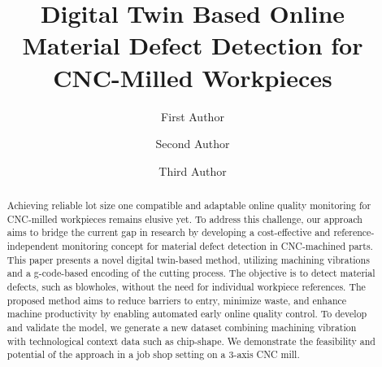 \documentclass[5p,times,procedia]{elsarticle}
\begin{document}
\begin{frontmatter}






\title{Digital Twin Based Online Material Defect Detection for CNC-Milled Workpieces}




\author[a,b]{First Author} 
\author[a,c]{Second Author}%
\author[b]{Third Author}

\address[a]{ESB Business School, Reutlingen University, Alteburgstra\ss e 150, 72762 Reutlingen, Germany}
\address[b]{Department of Industrial Engineering, Stellenbosch University, Joubert Street, Stellenbosch, 7600, South Africa}
\address[c]{Fraunhofer Institute for Manufacturing Engineering and Automation IPA, Nobelstra\ss e 12, 70569 Stuttgart, Germany}


\begin{abstract}
Achieving reliable lot size one compatible and adaptable online quality monitoring for CNC-milled workpieces remains elusive yet.
To address this challenge, our approach aims to bridge the current gap in research by developing a cost-effective and reference-independent monitoring concept for material defect detection in CNC-machined parts. This paper presents a novel digital twin-based method, utilizing machining vibrations and a g-code-based encoding of the cutting process. The objective is to detect material defects, such as blowholes, without the need for individual workpiece references. The proposed method aims to reduce barriers to entry, minimize waste, and enhance machine productivity by enabling automated early online quality control. To develop and validate the model, we generate a new dataset combining machining vibration with technological context data such as chip-shape. We demonstrate the feasibility and potential of the approach in a job shop setting on a 3-axis CNC mill.
\end{abstract}


\end{frontmatter}
\end{document}
